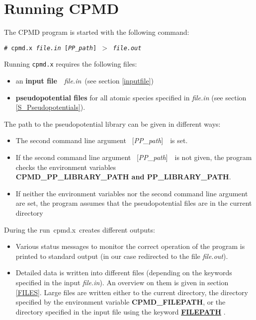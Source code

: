 \documentclass[twoside,10pt,titlepage,a4paper]{article}
\newcommand{\referto}[2]{\hyperlink{#1}{#2}}
\newcommand{\referto}[2]{\htmlref{#2}{#1}}
\newcommand{\refkeyword}[1]{%
\referto{#1}{\textbf{#1}}%
\index{#1}%
}%
\newcommand{\shellcommand}[1]{%
  \vspace*{3mm}
  \noindent
  \texttt{\# #1}
  \vspace*{3mm}
}
\begin{document}
\section{Running CPMD}\label{runcpmd}
%
The CPMD program is started with the following command:

\shellcommand{cpmd.x {\sl file.in} [{\sl PP\_path}] $>$ {\sl file.out}}

Running \texttt{cpmd.x} requires the following files:
\begin{itemize}
  \item an {\bf input file}\ \ {\sl file.in}\ (see section \ref{inputfile})

  \item {\bf pseudopotential files} for all atomic species specified
        in {\sl file.in} (see section \ref{S_Pseudopotentials}).
\end{itemize}

\bigskip

The path to the pseudopotential library can be given in different ways:
\begin{itemize}

\item The second command line argument \ [{\sl PP\_path}]\ \ is set.

\item If the second command line argument \ [{\sl PP\_path}]\ \ is not
  given, the program checks the environment variables\\ {\bf
    CPMD\_PP\_LIBRARY\_PATH and PP\_LIBRARY\_PATH}.

\item If neither the environment variables nor the second command line
  argument are set, the program assumes that the pseudopotential files are
  in the current directory
\end{itemize}

During the run\ cpmd.x\ creates different outputs:
\begin{itemize}
\item Various status messages to monitor the correct operation of the program is
  printed to standard output (in our case redirected to the file {\sl file.out}).

\item
  Detailed data is written into different files (depending on the keywords
  specified in the input {\sl file.in}). An overview on them is given in section
  \ref{FILES}. Large files are written either to the current directory, the directory
  specified by the environment variable {\bf CPMD\_FILEPATH}, or the directory
  specified in the input file using the keyword \refkeyword{FILEPATH}.
\end{itemize}
\end{document}

